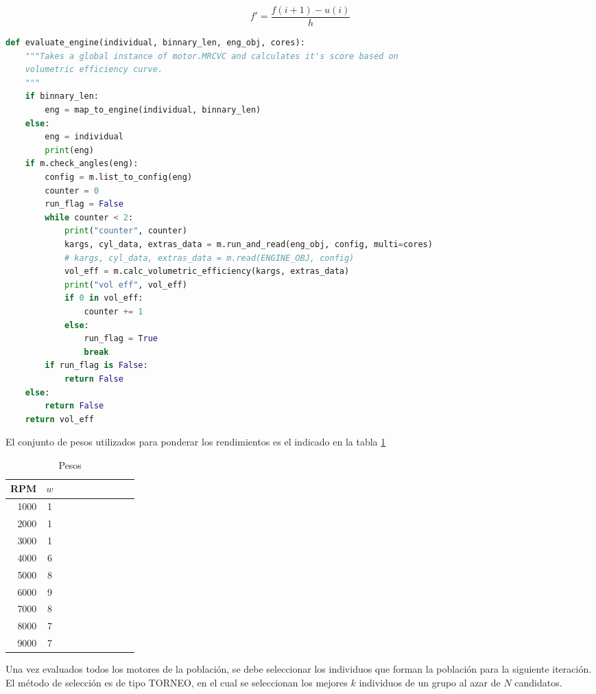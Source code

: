 \begin{equation}
  f' = \frac{f(i+1) - u(i)}{h}
  \label{eq:derivada}
\end{equation}

\begin{lstlisting}[language=Python]
def evaluate_engine(individual, binnary_len, eng_obj, cores):
    """Takes a global instance of motor.MRCVC and calculates it's score based on
    volumetric efficiency curve.
    """
    if binnary_len:
        eng = map_to_engine(individual, binnary_len)
    else:
        eng = individual
        print(eng)
    if m.check_angles(eng):
        config = m.list_to_config(eng)
        counter = 0
        run_flag = False
        while counter < 2:
            print("counter", counter)
            kargs, cyl_data, extras_data = m.run_and_read(eng_obj, config, multi=cores)
            # kargs, cyl_data, extras_data = m.read(ENGINE_OBJ, config)
            vol_eff = m.calc_volumetric_efficiency(kargs, extras_data)
            print("vol eff", vol_eff)
            if 0 in vol_eff:
                counter += 1
            else:
                run_flag = True
                break
        if run_flag is False:
            return False
    else:
        return False
    return vol_eff
\end{lstlisting}

El conjunto de pesos utilizados para ponderar los rendimientos es el indicado
en la tabla \ref{tab:pesos}

\begin{table}
  \centering
  \begin{tabular}{rccccccccc} \toprule
      RPM  & $w$ \\ \midrule
      1000 & 1 \\
      2000 & 1 \\
      3000 & 1 \\
      4000 & 6 \\
      5000 & 8 \\
      6000 & 9 \\
      7000 & 8 \\
      8000 & 7 \\
      9000 & 7 \\ \bottomrule
  \end{tabular}
  \caption{Pesos}
  \label{tab:pesos}
\end{table}


Una vez evaluados todos los motores de la población, se debe seleccionar los
individuos que forman la población para la siguiente iteración.
%
El método de selección es de tipo TORNEO, en el cual se seleccionan los mejores
$k$ individuos de un grupo al azar de $N$ candidatos.
%

